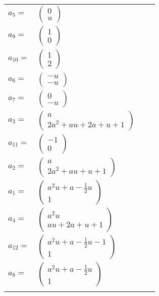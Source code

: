 \documentclass[1p]{elsarticle_modified}
\theoremstyle{definition}
\begin{document}
\begin{tabular}{m{7pt} m{180pt} m{7pt} m{180pt} }
\flushright $a_{5}=$&$\begin{pmatrix}0\\u\end{pmatrix}$ \\
\flushright $a_{9}=$&$\begin{pmatrix}1\\0\end{pmatrix}$ \\
\flushright $a_{10}=$&$\begin{pmatrix}1\\2\end{pmatrix}$ \\
\flushright $a_{6}=$&$\begin{pmatrix}- u\\- u\end{pmatrix}$ \\
\flushright $a_{7}=$&$\begin{pmatrix}0\\- u\end{pmatrix}$ \\
\flushright $a_{3}=$&$\begin{pmatrix}a\\2 a^2+a u+2 a+u+1\end{pmatrix}$ \\
\flushright $a_{11}=$&$\begin{pmatrix}-1\\0\end{pmatrix}$ \\
\flushright $a_{2}=$&$\begin{pmatrix}a\\2 a^2+a u+u+1\end{pmatrix}$ \\
\flushright $a_{1}=$&$\begin{pmatrix}a^2 u+a-\frac{1}{2} u\\1\end{pmatrix}$ \\
\flushright $a_{4}=$&$\begin{pmatrix}a^2 u\\a u+2 a+u+1\end{pmatrix}$ \\
\flushright $a_{12}=$&$\begin{pmatrix}a^2 u+a-\frac{1}{2} u-1\\1\end{pmatrix}$ \\
\flushright $a_{8}=$&$\begin{pmatrix}a^2 u+a-\frac{1}{2} u\\1\end{pmatrix}$\\&\end{tabular}
\end{document}
